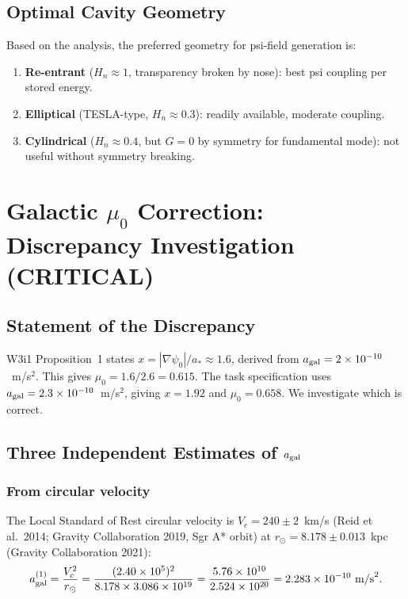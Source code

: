 \documentclass[11pt,twocolumn]{article}
\newcommand{\astar}{a_*}
\begin{document}
\subsection{Optimal Cavity Geometry}

Based on the analysis, the preferred geometry for psi-field generation is:
\begin{enumerate}[nosep]
\item \textbf{Re-entrant} ($H_n \approx 1$, transparency broken by nose):
best psi coupling per stored energy.
\item \textbf{Elliptical} (TESLA-type, $H_n \approx 0.3$): readily available,
moderate coupling.
\item \textbf{Cylindrical} ($H_n \approx 0.4$, but $G = 0$ by symmetry for
fundamental mode): not useful without symmetry breaking.
\end{enumerate}


\section{Galactic $\mu_0$ Correction: Discrepancy Investigation (CRITICAL)}
\label{sec:mu0}

\subsection{Statement of the Discrepancy}

W3i1 Proposition~1 states $x = |\nabla\psi_0|/\astar \approx 1.6$, derived from
$a_{\rm gal} = 2\times10^{-10}$~m/s$^2$. This gives $\mu_0 = 1.6/2.6 = 0.615$.
The task specification uses $a_{\rm gal} = 2.3\times10^{-10}$~m/s$^2$, giving
$x = 1.92$ and $\mu_0 = 0.658$. We investigate which is correct.

\subsection{Three Independent Estimates of $a_{\rm gal}$}

\subsubsection{From circular velocity}

The Local Standard of Rest circular velocity is $V_c = 240\pm2$~km/s
(Reid et al.\ 2014; Gravity Collaboration 2019, Sgr A* orbit) at
$r_\odot = 8.178\pm0.013$~kpc (Gravity Collaboration 2021):
\begin{equation}
a_{\rm gal}^{(1)} = \frac{V_c^2}{r_\odot}
= \frac{(2.40\times10^5)^2}{8.178\times3.086\times10^{19}}
= \frac{5.76\times10^{10}}{2.524\times10^{20}}
= 2.283\times10^{-10}~\text{m/s}^2.
\label{eq:agal_circular}
\end{equation}
\end{document}
